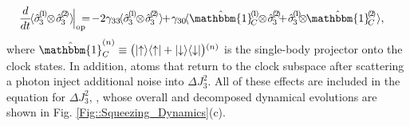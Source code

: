 \documentclass[aps,pra,twocolumn]{revtex4-1} %
\newcommand{\varz}{\Delta J_3^2}
\begin{document}
	\begin{align} \label{Eq::TwoBodySpinDecay}
		\!\!\!\!\!\!\frac{d}{dt}\! \expt{\hat{\sigma}\!_3^{(\!1\!)}\!\! \otimes\! \hat{\sigma}\!_3^{(\!2\!)} }  \!\Big|_{\rm op}\!\!\!\! =\! - 2 \gamma_{33} \! \expt{\hat{\sigma}\!_3^{(\!1\!)} \!\!\otimes\! \hat{\sigma}\!_3^{(\!2\!)} } \!\!+\! \gamma_{30}\! \expt{ \hat{\mathbbm{1}}\!^{(\!1\!)}_C \!\!\otimes\! \hat{\sigma}\!_3^{(\!2\!)\!} \!\!+\! \hat{\sigma}\!_3^{(\!1\!)} \!\!\!\otimes\!\! \hat{\mathbbm{1}}\!^{(\!2\!)}_C },
	\end{align}
where $\hat{\mathbbm{1}}^{(n)}_C \equiv \big( \op{\uparrow}{\uparrow} + \op{\downarrow}{\downarrow} \big){}^{(n)}$ is the single-body projector onto the clock states. 
In addition, atoms that return to the clock subspace after scattering a photon inject additional noise into $\varz$.  
All of these effects are included in the equation for $\varz$, , whose overall and decomposed dynamical evolutions are shown in Fig. \ref{Fig::Squeezing_Dynamics}(c). 
\end{document}
